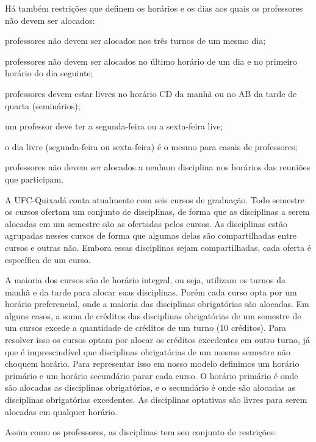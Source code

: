 Há também restrições que definem os horários e os dias aos quais os professores não devem ser alocados:

\begin{alineascomponto}
\item professores não devem ser alocados nos três turnos de um mesmo dia;
\item professores não devem ser alocados no último horário de um dia e no primeiro horário do dia seguinte;
\item professores devem estar livres no horário CD da manhã ou no AB da tarde de quarta (seminários);
\item um professor deve ter a segunda-feira ou a sexta-feira live;
\item o dia livre (segunda-feira ou sexta-feira) é o mesmo para casais de professores;
\item professores não devem ser alocados a nenhum disciplina nos horários das reuniões que participam.
\end{alineascomponto}

A UFC-Quixadá conta atualmente com seis cursos de graduação. Todo semestre os cursos ofertam um conjunto de disciplinas, de forma que as disciplinas a serem alocadas em um semestre são as ofertadas pelos cursos. As disciplinas estão agrupadas nesses cursos de forma que algumas delas são compartilhadas entre cursos e outras não. Embora essas disciplinas sejam compartilhadas, cada oferta é específica de um curso. 

A maioria dos cursos são de horário integral, ou seja, utilizam os turnos da manhã e da tarde para alocar suas disciplinas. Porém cada curso opta por um horário preferencial, onde a maioria das disciplinas obrigatórias são alocadas. Em alguns casos, a soma de créditos das disciplinas obrigatórias de um semestre de um cursos excede a quantidade de créditos de um turno (10 créditos). Para resolver isso os cursos optam por alocar os créditos excedentes em outro turno, já que é imprescindível que disciplinas obrigatórias de um mesmo semestre não choquem horário. Para representar isso em nosso modelo definimos um horário primário e um horário secundário parar cada curso. O horário primário é onde são alocadas as disciplinas obrigatórias, e o secundário é onde são alocadas as disciplinas obrigatórias excedentes. As disciplinas optativas são livres para serem alocadas em qualquer horário.

Assim como os professores, as disciplinas tem seu conjunto de restrições:

